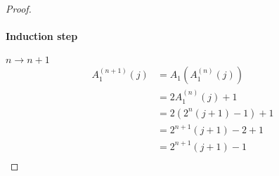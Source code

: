 \documentclass{article}
\begin{document}
\begin{tasks}
{\begin{proof}
                \paragraph{Induction step} \(n \to n+1\)
                \begin{displaymath}
                    \begin{aligned}
                        A_1^{(n+1)}(j) 
                        &= A_1(A_1^{(n)}(j)) \\
                        &= 2A_1^{(n)}(j) + 1 \\
                        &= 2(2^n(j + 1) - 1) + 1 \\
                        &= 2^{n+1}(j + 1) - 2 + 1 \\
                        &= 2^{n+1}(j + 1) - 1 \\
                    \end{aligned}
                \end{displaymath}
            \end{proof}
        }
        \item {
            \begin{minipage}[t]{0.5\linewidth}
                \begin{figure}[H]
                    \centering
\end{figure}
\end{minipage}}
\end{tasks}
\end{document}
